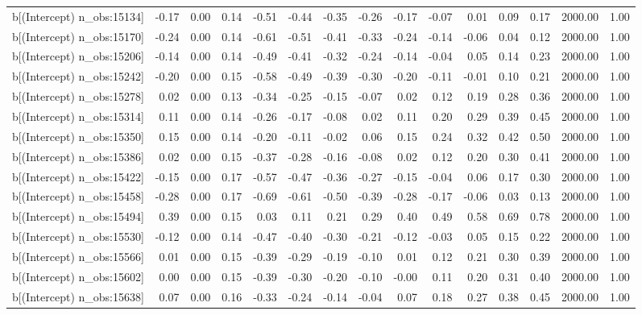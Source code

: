 \begin{table}[ht]
\begin{tabular}{rrrrrrrrrrrrrrr}
  b[(Intercept) n\_obs:15134] & -0.17 & 0.00 & 0.14 & -0.51 & -0.44 & -0.35 & -0.26 & -0.17 & -0.07 & 0.01 & 0.09 & 0.17 & 2000.00 & 1.00 \\ 
  b[(Intercept) n\_obs:15170] & -0.24 & 0.00 & 0.14 & -0.61 & -0.51 & -0.41 & -0.33 & -0.24 & -0.14 & -0.06 & 0.04 & 0.12 & 2000.00 & 1.00 \\ 
  b[(Intercept) n\_obs:15206] & -0.14 & 0.00 & 0.14 & -0.49 & -0.41 & -0.32 & -0.24 & -0.14 & -0.04 & 0.05 & 0.14 & 0.23 & 2000.00 & 1.00 \\ 
  b[(Intercept) n\_obs:15242] & -0.20 & 0.00 & 0.15 & -0.58 & -0.49 & -0.39 & -0.30 & -0.20 & -0.11 & -0.01 & 0.10 & 0.21 & 2000.00 & 1.00 \\ 
  b[(Intercept) n\_obs:15278] & 0.02 & 0.00 & 0.13 & -0.34 & -0.25 & -0.15 & -0.07 & 0.02 & 0.12 & 0.19 & 0.28 & 0.36 & 2000.00 & 1.00 \\ 
  b[(Intercept) n\_obs:15314] & 0.11 & 0.00 & 0.14 & -0.26 & -0.17 & -0.08 & 0.02 & 0.11 & 0.20 & 0.29 & 0.39 & 0.45 & 2000.00 & 1.00 \\ 
  b[(Intercept) n\_obs:15350] & 0.15 & 0.00 & 0.14 & -0.20 & -0.11 & -0.02 & 0.06 & 0.15 & 0.24 & 0.32 & 0.42 & 0.50 & 2000.00 & 1.00 \\ 
  b[(Intercept) n\_obs:15386] & 0.02 & 0.00 & 0.15 & -0.37 & -0.28 & -0.16 & -0.08 & 0.02 & 0.12 & 0.20 & 0.30 & 0.41 & 2000.00 & 1.00 \\ 
  b[(Intercept) n\_obs:15422] & -0.15 & 0.00 & 0.17 & -0.57 & -0.47 & -0.36 & -0.27 & -0.15 & -0.04 & 0.06 & 0.17 & 0.30 & 2000.00 & 1.00 \\ 
  b[(Intercept) n\_obs:15458] & -0.28 & 0.00 & 0.17 & -0.69 & -0.61 & -0.50 & -0.39 & -0.28 & -0.17 & -0.06 & 0.03 & 0.13 & 2000.00 & 1.00 \\ 
  b[(Intercept) n\_obs:15494] & 0.39 & 0.00 & 0.15 & 0.03 & 0.11 & 0.21 & 0.29 & 0.40 & 0.49 & 0.58 & 0.69 & 0.78 & 2000.00 & 1.00 \\ 
  b[(Intercept) n\_obs:15530] & -0.12 & 0.00 & 0.14 & -0.47 & -0.40 & -0.30 & -0.21 & -0.12 & -0.03 & 0.05 & 0.15 & 0.22 & 2000.00 & 1.00 \\ 
  b[(Intercept) n\_obs:15566] & 0.01 & 0.00 & 0.15 & -0.39 & -0.29 & -0.19 & -0.10 & 0.01 & 0.12 & 0.21 & 0.30 & 0.39 & 2000.00 & 1.00 \\ 
  b[(Intercept) n\_obs:15602] & 0.00 & 0.00 & 0.15 & -0.39 & -0.30 & -0.20 & -0.10 & -0.00 & 0.11 & 0.20 & 0.31 & 0.40 & 2000.00 & 1.00 \\ 
  b[(Intercept) n\_obs:15638] & 0.07 & 0.00 & 0.16 & -0.33 & -0.24 & -0.14 & -0.04 & 0.07 & 0.18 & 0.27 & 0.38 & 0.45 & 2000.00 & 1.00 \\ 

\end{tabular}
\end{table}

